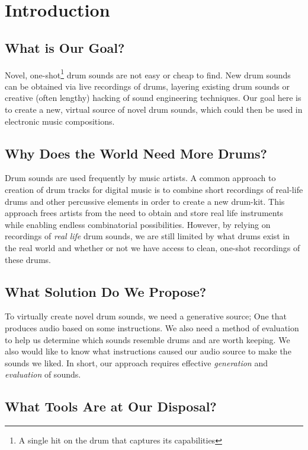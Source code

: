 \documentclass[\main/thesis.tex]{subfiles}
\begin{document}
\chapter{Introduction}


\section{What is Our Goal?}
Novel, one-shot\footnote{A single hit on the drum that captures its capabilities} drum sounds are not easy or cheap to find. New drum sounds can be obtained via live recordings of drums, layering existing drum sounds or creative (often lengthy) hacking of sound engineering techniques. Our goal here is to create a new, virtual source of novel drum sounds, which could then be used in electronic music compositions.

\section{Why Does the World Need More Drums?}
 Drum sounds are used frequently by music artists. A common approach to creation of drum tracks for digital music is to combine short recordings of real-life drums and other percussive elements in order to create a new drum-kit. This approach frees artists from the need to obtain and store real life instruments while enabling endless combinatorial possibilities. However, by relying on recordings of \textit{real life} drum sounds, we are still limited by what drums exist in the real world and whether or not we have access to clean, one-shot recordings of these drums.

\section{What Solution Do We Propose?}
To virtually create novel drum sounds, we need a generative source; One that produces audio based on some instructions. We also need a method of evaluation to help us determine which sounds resemble drums and are worth keeping. We also would like to know what instructions caused our audio source to make the sounds we liked. In short, our approach requires effective \textit{generation} and \textit{evaluation} of sounds. 

\section{What Tools Are at Our Disposal?}
\end{document}
